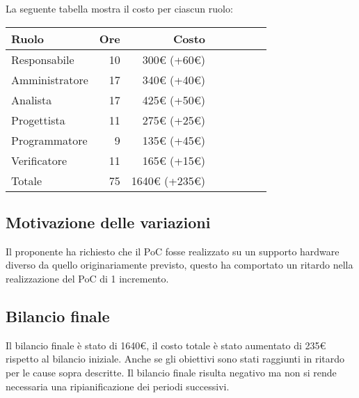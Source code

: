 La seguente tabella mostra il costo per ciascun ruolo:
\begin{table}[ht]
    \begin{tabularx}{\linewidth}{X|rrrrrrr}
    \rowcolor{gray!30}Ruolo & Ore & Costo \\
    \hline
    Responsabile                            & 10    & 300€ (+60€)\\
    \rowcolor{gray!10}Amministratore        & 17    & 340€ (+40€)\\
    Analista                                & 17    & 425€ (+50€)\\
    \rowcolor{gray!10}Progettista           & 11    & 275€ (+25€) \\
    Programmatore                           & 9     & 135€ (+45€) \\
    \rowcolor{gray!10}Verificatore          & 11    & 165€ (+15€)\\
    \hline Totale                           & 75    & 1640€ (+235€) \\ 
    \end{tabularx}
\end{table}

\subsection{Motivazione delle variazioni}
Il proponente ha richiesto che il PoC fosse realizzato su un supporto hardware diverso da quello originariamente previsto, questo ha comportato un ritardo nella realizzazione del PoC di 1 incremento.

\subsection{Bilancio finale}
Il bilancio finale è stato di 1640€, il costo totale è stato aumentato di 235€ rispetto al bilancio iniziale. Anche se gli obiettivi sono stati raggiunti in ritardo per le cause sopra descritte. Il bilancio finale risulta negativo ma non si rende necessaria una ripianificazione dei periodi successivi.